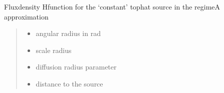 \documentclass[letterpaper,10pt,english]{sphinxmanual}
\begin{document}
\begin{fulllineitems}
\label{\detokenize{diffsph.profiles:diffsph.profiles.analytics.cofdA}}
\pysigstartsignatures
{}
\pysigstopsignatures
\sphinxAtStartPar
Flux\sphinxhyphen{}density H\sphinxhyphen{}function for the ‘constant’ top\sphinxhyphen{}hat source in the regime\sphinxhyphen{}A approximation
\begin{quote}\begin{description}
\begin{itemize}
\item {} 
\sphinxAtStartPar
{} \textendash{} angular radius in rad

\item {} 
\sphinxAtStartPar
{} \textendash{} scale radius

\item {} 
\sphinxAtStartPar
{} \textendash{} diffusion radius parameter

\item {} 
\sphinxAtStartPar
{} \textendash{} distance to the source

\end{itemize}

\end{description}\end{quote}

\end{fulllineitems}

\end{document}
